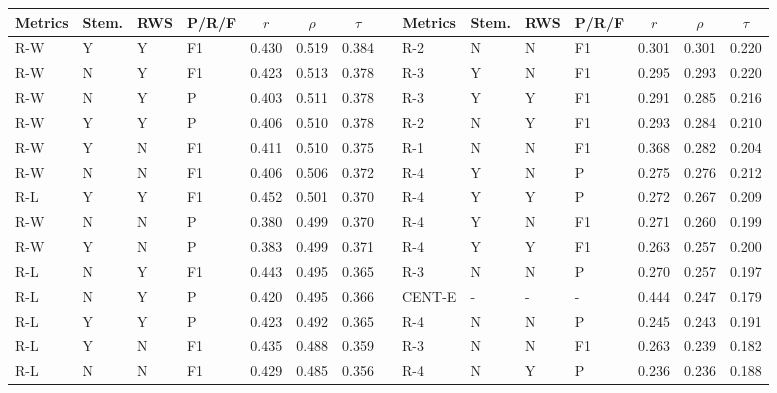 \documentclass[11pt,a4paper]{article}
\begin{document}
\begin{table}[]
{
\scriptsize
\centering
\begin{tabular}{lllllllllllllll}
\hline
\multicolumn{1}{c}{Metrics} & \multicolumn{1}{c}{Stem.} & \multicolumn{1}{c}{RWS} & \multicolumn{1}{c}{P/R/F} & \multicolumn{1}{c}{$r$} & \multicolumn{1}{c}{$\rho$} & \multicolumn{1}{c}{$\tau$} & \multicolumn{1}{c}{} & \multicolumn{1}{c}{Metrics} & \multicolumn{1}{c}{Stem.} & \multicolumn{1}{c}{RWS} & \multicolumn{1}{c}{P/R/F} & \multicolumn{1}{c}{$r$} & \multicolumn{1}{c}{$\rho$} & \multicolumn{1}{c}{$\tau$} \\ \hline
\textsc{R-W} & Y & Y & F1 & 0.430 & 0.519 & 0.384 &  & \textsc{R-2} & N & N & F1 & 0.301 & 0.301 & 0.220 \\
\textsc{R-W} & N & Y & F1 & 0.423 & 0.513 & 0.378 &  & \textsc{R-3} & Y & N & F1 & 0.295 & 0.293 & 0.220 \\
\textsc{R-W} & N & Y & P & 0.403 & 0.511 & 0.378 &  & \textsc{R-3} & Y & Y & F1 & 0.291 & 0.285 & 0.216 \\
\textsc{R-W} & Y & Y & P & 0.406 & 0.510 & 0.378 &  & \textsc{R-2} & N & Y & F1 & 0.293 & 0.284 & 0.210 \\
\textsc{R-W} & Y & N & F1 & 0.411 & 0.510 & 0.375 &  & \textsc{R-1} & N & N & F1 & 0.368 & 0.282 & 0.204 \\
\textsc{R-W} & N & N & F1 & 0.406 & 0.506 & 0.372 &  & \textsc{R-4} & Y & N & P & 0.275 & 0.276 & 0.212 \\
\textsc{R-L} & Y & Y & F1 & 0.452 & 0.501 & 0.370 &  & \textsc{R-4} & Y & Y & P & 0.272 & 0.267 & 0.209 \\
\textsc{R-W} & N & N & P & 0.380 & 0.499 & 0.370 &  & \textsc{R-4} & Y & N & F1 & 0.271 & 0.260 & 0.199 \\
\textsc{R-W} & Y & N & P & 0.383 & 0.499 & 0.371 &  & \textsc{R-4} & Y & Y & F1 & 0.263 & 0.257 & 0.200 \\
\textsc{R-L} & N & Y & F1 & 0.443 & 0.495 & 0.365 &  & \textsc{R-3} & N & N & P & 0.270 & 0.257 & 0.197 \\
\textsc{R-L} & N & Y & P & 0.420 & 0.495 & 0.366 &  & \textsc{CENT-E} & - & - & - & 0.444 & 0.247 & 0.179 \\
\textsc{R-L} & Y & Y & P & 0.423 & 0.492 & 0.365 &  & \textsc{R-4} & N & N & P & 0.245 & 0.243 & 0.191 \\
\textsc{R-L} & Y & N & F1 & 0.435 & 0.488 & 0.359 &  & \textsc{R-3} & N & N & F1 & 0.263 & 0.239 & 0.182 \\
\textsc{R-L} & N & N & F1 & 0.429 & 0.485 & 0.356 &  & \textsc{R-4} & N & Y & P & 0.236 & 0.236 & 0.188 \\

\end{tabular}}
\end{table}
\end{document}

